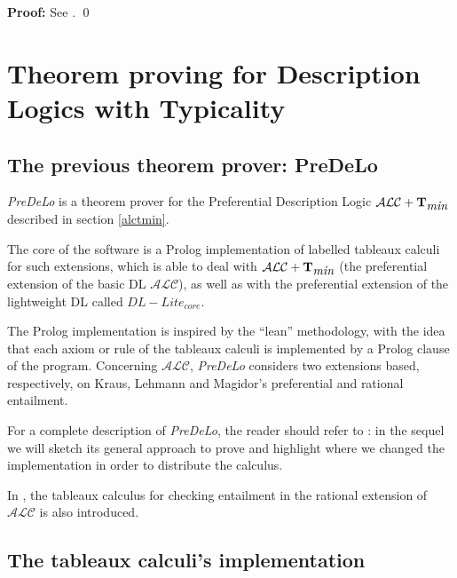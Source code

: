 \documentclass[a4paper, 11pt, oneside]{duthesis}
\newcommand{\tip}{{\bf T}}
\newcommand{\alc}{\mathcal{ALC}}
\newcommand{\alctmin}{\mathcal{ALC}+\tip_{\mbox{\em min}}}
\newenvironment{proof}
{\begin{trivlist} \item[] {\bf Proof:}}%
{\qed \end{trivlist}}
\newenvironment{proof}
{\begin{trivlist} \item[] {\bf Proof:}}%
{\qed \end{trivlist}}
\newcounter{posu}
\newtheorem{proof}[posu]{Proof}
\begin{document}
\begin{proof}
See \cite{Giordano:2013:NDL:2435476.2435957}.
\end{proof}

\newpage



\chapter{Theorem proving for Description Logics with Typicality}\label{chap_theorem_proving}

\section{The previous theorem prover: PreDeLo}\label{predelo}
\emph{PreDeLo} is a theorem prover for the Preferential Description Logic $\alctmin$ described in section \ref{alctmin}.

The core of the software is a Prolog implementation of labelled tableaux calculi for such extensions, which is able to deal with $\alctmin$ (the preferential extension of the basic DL $\alc$), as well as with the preferential extension of the lightweight DL called $DL-Lite_{core}$.

The Prolog implementation is inspired by the ``lean'' methodology, with the idea that each axiom or rule of the tableaux calculi is implemented by a Prolog clause of the program.
Concerning $\alc$, \emph{PreDeLo} considers two extensions based, respectively, on Kraus, Lehmann and Magidor’s preferential and rational entailment.

For a complete description of \emph{PreDeLo}, the reader should refer to \cite{conf/aiia/GiordanoGJOP13}: in the sequel we will sketch its general approach to prove and highlight where we changed the implementation in order to distribute the calculus.

In \cite{conf/aiia/GiordanoGJOP13}, the tableaux calculus for checking entailment in the rational extension of $\alc$ is also introduced.

\newpage

\section{The tableaux calculi's implementation}\label{tableaux_implementation}
\end{document}
